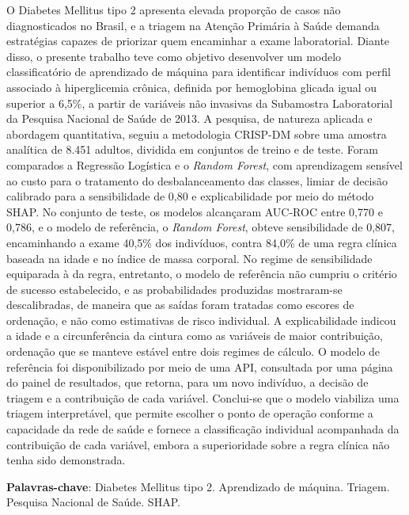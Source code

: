 
\setlength{\absparsep}{18pt} %
\begin{resumo}
	\SingleSpacing
	O Diabetes Mellitus tipo 2 apresenta elevada proporção de casos não diagnosticados no Brasil, e a triagem na Atenção Primária à Saúde demanda estratégias capazes de priorizar quem encaminhar a exame laboratorial. Diante disso, o presente trabalho teve como objetivo desenvolver um modelo classificatório de aprendizado de máquina para identificar indivíduos com perfil associado à hiperglicemia crônica, definida por hemoglobina glicada igual ou superior a 6,5\%, a partir de variáveis não invasivas da Subamostra Laboratorial da Pesquisa Nacional de Saúde de 2013. A pesquisa, de natureza aplicada e abordagem quantitativa, seguiu a metodologia CRISP-DM sobre uma amostra analítica de 8.451 adultos, dividida em conjuntos de treino e de teste. Foram comparados a Regressão Logística e o \textit{Random Forest}, com aprendizagem sensível ao custo para o tratamento do desbalanceamento das classes, limiar de decisão calibrado para a sensibilidade de 0,80 e explicabilidade por meio do método SHAP. No conjunto de teste, os modelos alcançaram AUC-ROC entre 0,770 e 0,786, e o modelo de referência, o \textit{Random Forest}, obteve sensibilidade de 0,807, encaminhando a exame 40,5\% dos indivíduos, contra 84,0\% de uma regra clínica baseada na idade e no índice de massa corporal. No regime de sensibilidade equiparada à da regra, entretanto, o modelo de referência não cumpriu o critério de sucesso estabelecido, e as probabilidades produzidas mostraram-se descalibradas, de maneira que as saídas foram tratadas como escores de ordenação, e não como estimativas de risco individual. A explicabilidade indicou a idade e a circunferência da cintura como as variáveis de maior contribuição, ordenação que se manteve estável entre dois regimes de cálculo. O modelo de referência foi disponibilizado por meio de uma API, consultada por uma página do painel de resultados, que retorna, para um novo indivíduo, a decisão de triagem e a contribuição de cada variável. Conclui-se que o modelo viabiliza uma triagem interpretável, que permite escolher o ponto de operação conforme a capacidade da rede de saúde e fornece a classificação individual acompanhada da contribuição de cada variável, embora a superioridade sobre a regra clínica não tenha sido demonstrada.
	
	\textbf{Palavras-chave}: Diabetes Mellitus tipo 2. Aprendizado de máquina. Triagem. Pesquisa Nacional de Saúde. SHAP.
\end{resumo}

